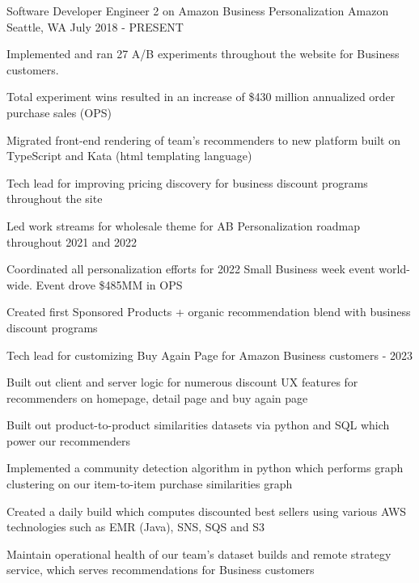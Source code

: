 

\begin{cventries}

  \cventry
    {Software Developer Engineer 2 on Amazon Business Personalization} %
    {Amazon} %
    {Seattle, WA} %
    {July 2018 - PRESENT} %
    {
      \begin{cvitems} %
        \item {Implemented and ran 27 A/B experiments throughout the website for Business customers.}
        \item {Total experiment wins resulted in an increase of \$430 million annualized order purchase sales (OPS)}
        \item {Migrated front-end rendering of team's recommenders to new platform built on TypeScript and Kata (html templating language)}
        \item {Tech lead for improving pricing discovery for business discount programs throughout the site}
        \item {Led work streams for wholesale theme for AB Personalization roadmap throughout 2021 and 2022}
        \item {Coordinated all personalization efforts for 2022 Small Business week event world-wide. Event drove \$485MM in OPS }
        \item {Created first Sponsored Products + organic recommendation blend with business discount programs}
        \item {Tech lead for customizing Buy Again Page for Amazon Business customers - 2023}
        \item {Built out client and server logic for numerous discount UX features for recommenders on homepage, detail page and buy again page}
        \item {Built out product-to-product similarities datasets via python and SQL which power our recommenders}
        \item {Implemented a community detection algorithm in python which performs graph clustering on our item-to-item purchase similarities graph}
        \item {Created a daily build which computes discounted best sellers using various AWS technologies such as EMR (Java), SNS, SQS and S3}
        \item {Maintain operational health of our team's dataset builds and remote strategy service, which serves recommendations for Business customers}
      \end{cvitems}
    }


\end{cventries}
